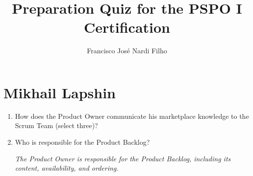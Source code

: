 \documentclass[a4paper,11pt]{article}
\newcommand{\cmark}{\ding{51}}%
\newcommand{\done}{\rlap{$\square$}{\raisebox{2pt}{\large\hspace{1pt}\cmark}}%
\hspace{-2.5pt}}
\begin{document}
\title{\bf{Preparation Quiz for the PSPO I Certification}}
\author{Francisco Jos\'e Nardi Filho}
\maketitle


\section*{Mikhail Lapshin}

\begin{enumerate}
    \item How does the Product Owner communicate his marketplace knowledge to the Scrum Team (select three)?

    \item Who is responsible for the Product Backlog?

    \textit{The Product Owner is responsible for the Product Backlog, including its content, availability, and ordering}.

\end{enumerate}
\end{document}
